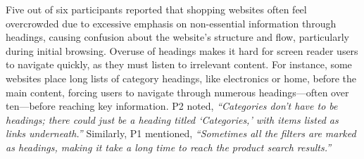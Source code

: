 Five out of six participants reported that shopping websites often feel overcrowded due to excessive emphasis on non-essential information through headings, causing confusion about the website's structure and flow, particularly during initial browsing. Overuse of headings makes it hard for screen reader users to navigate quickly, as they must listen to irrelevant content. For instance, some websites place long lists of category headings, like electronics or home, before the main content, forcing users to navigate through numerous headings—often over ten—before reaching key information. P2 noted, \textit{``Categories don’t have to be headings; there could just be a heading titled `Categories,' with items listed as links underneath.''} Similarly, P1 mentioned, \textit{``Sometimes all the filters are marked as headings, making it take a long time to reach the product search results.''}

